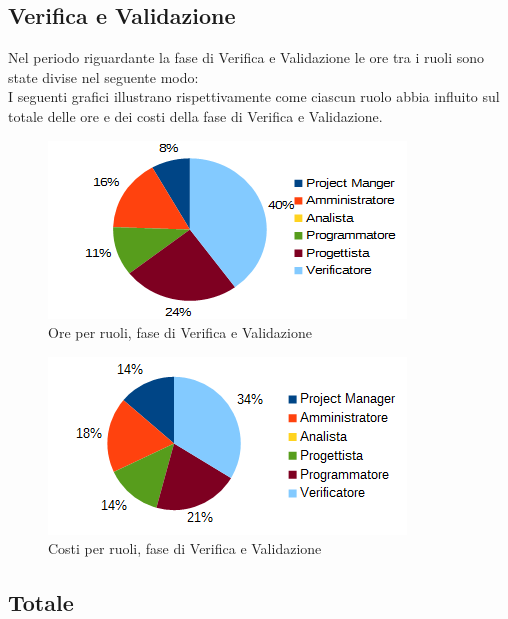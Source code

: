 	\subsection{Verifica e Validazione}
	Nel periodo riguardante la fase di Verifica e Validazione le ore tra i ruoli sono state divise nel seguente modo: \\
	I seguenti grafici illustrano rispettivamente come ciascun ruolo abbia influito sul totale
delle ore e dei costi della fase di Verifica e Validazione.
	\begin{figure}[htbp]
		\centering
		\includegraphics[scale=1]{immagini/grafici/validazione-torta.png}
		\caption{Ore per ruoli, fase di Verifica e Validazione}
	\end{figure}
	\begin{figure}[htbp]
		\centering
		\includegraphics[scale=1]{immagini/grafici/validazione-torta-costo.png}
		\caption{Costi per ruoli, fase di Verifica e Validazione}
	\end{figure}
	\subsection{Totale}
